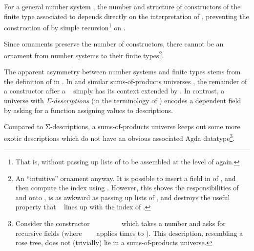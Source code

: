 For a general number system , the number and structure of constructors of the finite type  associated to  depends directly on the interpretation of , preventing the construction of  by simple recursion\footnote{That is, without passing up lists of  to be assembled at the level of  again.} on .

Since ornaments preserve the number of constructors, there cannot be an ornament from number systems to their finite types\footnote{An ``intuitive'' ornament anyway. It is possible to insert a  field in  of , and then compute the index using \AV{ ; }\AV{ ; }\AV{ \}}. However, this shoves the responsibilities of  and  onto , is as awkward as passing up lists of , and destroys the useful property that \  lines up with the index of .}.

The apparent asymmetry between number systems and finite types stems from the definition of  in . In  and similar sums-of-products universes \cite{practgen,sijsling}, the remainder of a constructor  after a \  simply has its context extended by . In contrast, a universe with \emph{Σ-descriptions} \cite{effectfully,progorn,algorn} (in the terminology of \cite{sijsling}) encodes a dependent field  by asking for a function  assigning values  to descriptions.

Compared to Σ-descriptions, a sums-of-products universe keeps out some more exotic descriptions which do not have an obvious associated Agda datatype\footnote{Consider the constructor \ \bN{}\ \ \ \ \ \ \  which takes a number  and asks for  recursive fields (where \ \ \  applies   times to ). This description, resembling a rose tree, does not (trivially) lie in a sums-of-products universe.}.


